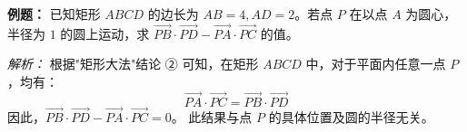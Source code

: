 \begin{examplebox}
\textbf{例题：} 已知矩形 $ABCD$ 的边长为 $AB=4, AD=2$。若点 $P$ 在以点 $A$ 为圆心，半径为 $1$ 的圆上运动，求 $\vec{PB} \cdot \vec{PD} - \vec{PA} \cdot \vec{PC}$ 的值。

\textit{解析：} 
根据"矩形大法"结论 ② 可知，在矩形 $ABCD$ 中，对于平面内任意一点 $P$，均有：
\[ \vec{PA} \cdot \vec{PC} = \vec{PB} \cdot \vec{PD} \]
因此，$\vec{PB} \cdot \vec{PD} - \vec{PA} \cdot \vec{PC} = 0$。
此结果与点 $P$ 的具体位置及圆的半径无关。
\end{examplebox}